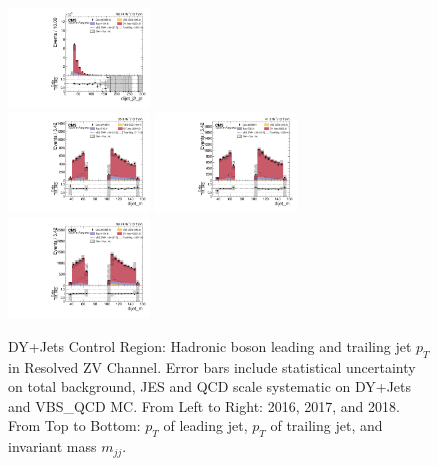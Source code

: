 \begin{figure}[!ht]
  \includegraphics[width=0.335\textwidth]{analysis_plots/2018_zjj/cr_vjets_l/dijet_j2_pt.pdf} \hspace{-10pt} \\
  \includegraphics[width=0.335\textwidth]{analysis_plots/2016_zjj/cr_vjets_l/dijet_m.pdf} \hspace{-10pt}
  \includegraphics[width=0.335\textwidth]{analysis_plots/2017_zjj/cr_vjets_l/dijet_m.pdf} \hspace{-10pt}
  \includegraphics[width=0.335\textwidth]{analysis_plots/2018_zjj/cr_vjets_l/dijet_m.pdf} \hspace{-10pt} \\
  \caption[DY+Jets Control Region: Hadronic boson leading and trailing jet \(p_T\) in Resolved ZV Channel]%
  {DY+Jets Control Region: Hadronic boson leading and trailing jet \(p_T\) in Resolved ZV Channel.
    Error bars include statistical uncertainty on total background,
    JES and QCD scale systematic on DY+Jets and VBS\_QCD MC\@. From Left to Right: 2016,
    2017, and 2018. From Top to Bottom: \( p_T \) of leading jet, \(p_T\) of trailing jet, and invariant mass \( m_{jj} \).}%
  \label{fig:zjj-cr-vjets-l-dijet1-pt-eta-m}
\end{figure}


